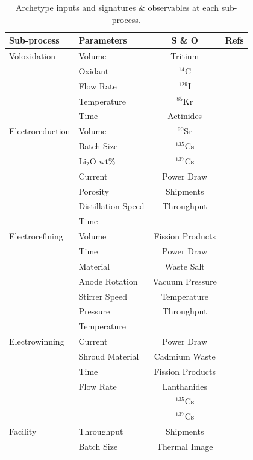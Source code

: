 \begin{table}[h]
	\centering
	\begin{tabularx}{0.9\linewidth}{llcr}
		\hline
		\textbf{Sub-process} & \textbf{Parameters} & \textbf{S \& O} & \textbf{Refs} \\
		\hline
		Voloxidation & Volume & Tritium & \cite{jubin_spent_2009} \\
		& Oxidant & $^{14}$C & \cite{flowsheet_1998} \\
		& Flow Rate &  $^{129}$I &  \\
		& Temperature & $^{85}$Kr &  \\
		& Time & Actinides & \\ \hline
		Electroreduction & Volume & $^{90}$Sr & \cite{borrelli_approaches_2017} \\
		& Batch Size & $^{135}$Cs & \cite{flowsheet_1998} \\
		& Li$_2$O wt\% & $^{137}$Cs & \cite{choi_electrochemical_2015} \\
		& Current & Power Draw & \cite{lee_korean_2011} \\
		& Porosity & Shipments & \cite{lee_modeling_2016} \\
		& Distillation Speed & Throughput & \\ 
		& Time & & \\ \hline
		Electrorefining & Volume & Fission Products & \cite{lee_advanced_2008} \\
		& Time & Power Draw & \cite{lee_korean_2011} \\
		& Material & Waste Salt & \cite{flowsheet_1998} \\
		& Anode Rotation & Vacuum Pressure & \cite{koyama_development_2012} \\
		& Stirrer Speed & Temperature & \cite{kim_development_2013} \\
		& Pressure & Throughput & \\
		& Temperature & & \\ \hline
		Electrowinning & Current & Power Draw & \cite{flowsheet_1998} \\
		& Shroud Material & Cadmium Waste & \cite{lee_korean_2011} \\
		& Time & Fission Products & \cite{borrelli_approaches_2017} \\
		& Flow Rate & Lanthanides & \\
		&  & $^{135}$Cs & \\
		&  & $^{137}$Cs & \\ \hline
		Facility & Throughput & Shipments & \\
		& Batch Size & Thermal Image & \\
		\hline
	\end{tabularx}
	\caption {Archetype inputs and signatures \& observables at each sub-process.}
	\label {tab:params}
\end{table}

